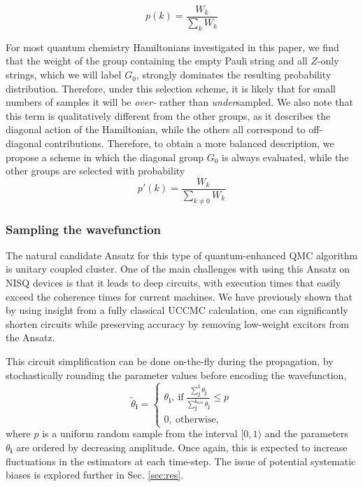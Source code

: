 \documentclass[%
 reprint,
 amsmath,amssymb,
 aps,
]{revtex4-2}
\begin{document}
\begin{equation}
    p(k) = \frac{W_k}{\sum_k W_k}
\end{equation}

For most quantum chemistry Hamiltonians investigated in this paper, we find that the weight of the group containing the empty Pauli string and all $Z$-only strings, which we will label $G_0$, strongly dominates the resulting probability distribution. Therefore, under this selection scheme, it is likely that for small numbers of samples it will be \textit{over-} rather than \textit{under}sampled. We also note that this term is qualitatively different from the other groups, as it describes the diagonal action of the Hamiltonian, while the others all correspond to off-diagonal contributions. Therefore, to obtain a more balanced description, we propose a scheme in which the diagonal group $G_0$ is always evaluated, while the other groups are selected with probability
\begin{equation}
    p'(k) = \frac{W_k}{\sum_{k\neq 0} W_k}
\end{equation}
\subsubsection{Sampling the wavefunction}

The natural candidate Ansatz for this type of quantum-enhanced QMC algorithm is unitary coupled cluster. One of the main challenges with using this Ansatz on NISQ devices is that it leads to deep circuits, with execution times that easily exceed the coherence times for current machines. We have previously shown that by using insight from a fully classical UCCMC calculation,\cite{Filip2020} one can significantly shorten circuits while preserving accuracy by removing low-weight excitors from the Ansatz.\cite{Filip2022}

This circuit simplification can be done on-the-fly during the propagation, by stochastically rounding the parameter values before encoding the wavefunction,
\begin{equation}
    \widetilde \theta_\mathbf{i} = \begin{cases}
    \theta_\mathbf{i},\ \mathrm{if}\ \frac{\sum_\mathbf{j}^\mathbf{i}\theta_\mathbf{j}}{\sum_\mathbf{j}^{\mathbf{i}_\mathrm{max}}\theta_\mathbf{j}} \leq p\\
    0,\ \mathrm{otherwise},
    \end{cases}
\end{equation}
where $p$ is a uniform random sample from the interval $[0,1)$ and the parameters $\theta_\mathbf{i}$ are ordered by decreasing amplitude. Once again, this is expected to increase fluctuations in the estimators at each time-step. The issue of potential systematic biases is explored further in Sec. \ref{sec:res}.
\end{document}
